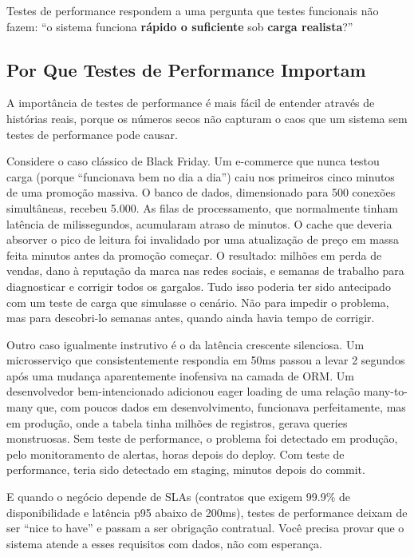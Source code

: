 Testes de performance respondem a uma pergunta que testes funcionais não fazem:
``o sistema funciona \textbf{rápido o suficiente} sob \textbf{carga realista}?''

\subsection{Por Que Testes de Performance Importam}

A importância de testes de performance é mais fácil de entender através de
histórias reais, porque os números secos não capturam o caos que um sistema sem
testes de performance pode causar.

Considere o caso clássico de Black Friday. Um e-commerce que nunca testou carga
(porque ``funcionava bem no dia a dia'') caiu nos primeiros cinco minutos
de uma promoção massiva. O banco de dados, dimensionado para 500 conexões
simultâneas, recebeu 5.000. As filas de processamento, que normalmente tinham
latência de milissegundos, acumularam atraso de minutos. O cache que deveria
absorver o pico de leitura foi invalidado por uma atualização de preço em massa
feita minutos antes da promoção começar. O resultado: milhões em perda de vendas,
dano à reputação da marca nas redes sociais, e semanas de trabalho para
diagnosticar e corrigir todos os gargalos. Tudo isso poderia ter sido antecipado
com um teste de carga que simulasse o cenário. Não para impedir o problema,
mas para descobri-lo semanas antes, quando ainda havia tempo de corrigir.

Outro caso igualmente instrutivo é o da latência crescente silenciosa. Um
microsserviço que consistentemente respondia em 50ms passou a levar 2 segundos
após uma mudança aparentemente inofensiva na camada de ORM. Um desenvolvedor
bem-intencionado adicionou eager loading de uma relação many-to-many que, com
poucos dados em desenvolvimento, funcionava perfeitamente, mas em produção, onde
a tabela tinha milhões de registros, gerava queries monstruosas. Sem teste de
performance, o problema foi detectado em produção, pelo monitoramento de
alertas, horas depois do deploy. Com teste de performance, teria sido detectado
em staging, minutos depois do commit.

E quando o negócio depende de SLAs (contratos que exigem 99.9\% de
disponibilidade e latência p95 abaixo de 200ms), testes de performance deixam
de ser ``nice to have'' e passam a ser obrigação contratual. Você precisa provar
que o sistema atende a esses requisitos com dados, não com esperança.

